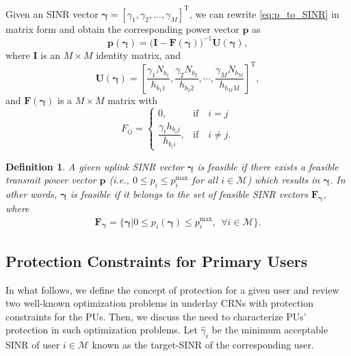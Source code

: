\documentclass[journal,twoside]{IEEEtran}
\newcommand{\M}{\mathcal{M}}
\newcommand{\pimax}{p_i^{\mathrm{max}}}
\newcommand{\pbold}{\mathbf{p}}
\newcommand{\gammahat}{\mathit{\widehat{\gamma}}}
\newcommand{\Fbold}{\mathbf{F}}
\newcommand{\gammabold}{\boldsymbol{\gamma}}
\newcommand{\hup}[2]{h_{#1 #2}}
\newcommand{\Nup}[1]{N_{#1}}
\newcommand{\pmax}{p^{\mathrm{max}}}
\newtheorem {definition}{Definition}
\begin{document}
		Given an SINR vector $\gammabold=[\gamma_1,\gamma_2,...,\gamma_M]^{\mathrm{T}}$, we can rewrite \eqref{eq:p_to_SINR} in matrix form and obtain  the corresponding power vector $\pbold$ as \cite{constrained_TPC}
		\begin{equation}
		\label{eq:gamma_to_p}
			\pbold(\gammabold)=\big(\mathbf{I}-\mathbf{F}(\gammabold)\big)^{-1}\mathbf{U}(\gammabold),
		\end{equation}
		where  $\mathbf{I}$ is an $M\times M$ identity matrix, and
		\begin{equation}
	 	\label{eq:41}
			\mathbf{U}(\gammabold)=\left[\frac{\gamma_{1} \Nup{b_1}}{\hup{b_1}{1}}, \frac{\gamma_{2} \Nup{b_2}}{\hup{b_2}{2}}, \cdots, \frac{\gamma_{M} \Nup{b_M}}{\hup{b_M}{M}} \right]^{\mathrm{T}},
		\end{equation}
		and $\mathbf{F}(\gammabold)$ is a $M\times M$ matrix with
		\begin{equation}
		\label{eq:6}
			F_{ij}=
			\begin{cases}
				0,& \mathrm{if}\quad i=j \\
				\dfrac{\gamma_i \hup{b_i}{j}}{\hup{b_i}{i}}, & \mathrm{if}\quad i\neq j.
			\end{cases}
		\end{equation}
	
	\begin{definition}
		A given uplink SINR vector $\gammabold$ is feasible if there exists a feasible transmit power vector $\pbold$ (i.e., $0\leq p_i\leq\pimax$ for all $i\in\M$) which results in $\gammabold$. In other words, $\gammabold$ is feasible if it belongs to the set of feasible SINR vectors $\mathbf{F}_{\gammabold}$, where
		\begin{align}
		\label{eq:feasible_uplink_sinr}
			\Fbold_{\gammabold}=\{\gammabold | 0\leq p_i(\gammabold) \leq \pmax_i, \ \ \forall i\in\M \}.
		\end{align}


	\end{definition}

	
	
\subsection{Protection Constraints for Primary Users}
	\label{sec:problem_statement}
In what follows, we define the concept of  protection for a given user and review two well-known optimization problems in underlay CRNs with  protection constraints for the PUs. Then, we discuss the need to characterize PUs' protection in such optimization problems.
	Let $\gammahat_i$ be the minimum acceptable SINR of user $i\in\M$ known as the target-SINR of the corresponding user. 
	
\end{document}
